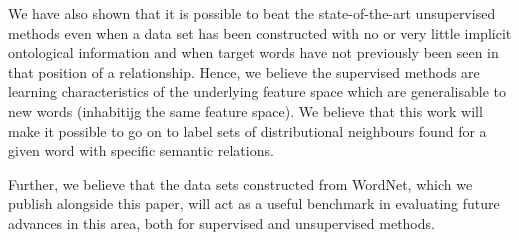 \documentclass[11pt]{article}
\begin{document}
We have also shown that it is possible to beat the state-of-the-art unsupervised methods even when a data set has been constructed with no or very little implicit ontological information and when target words have not previously been seen in that position of a relationship.  Hence, we believe the supervised methods are learning characteristics of the underlying feature space which are generalisable to new words (inhabitijg the same feature space).  We believe that this work will make it possible to go on to label sets of distributional neighbours found for a given word with specific semantic relations.

Further, we believe that the data sets constructed from WordNet, which we publish alongside this paper,  will act as a useful benchmark in evaluating future advances in this area, both for supervised and unsupervised methods.



\end{document}
